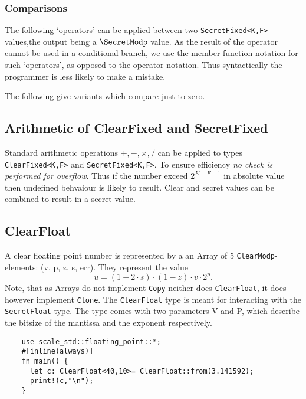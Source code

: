 \subsubsection{Comparisons}
The following `operators' can be applied between two \verb|SecretFixed<K,F>|
values,the output being a $\SecretModp$ value.
As the result of the operator cannot be used in a conditional branch,
we use the member function notation for such `operators', as opposed
to the operator notation. Thus syntactically the programmer is less
likely to make a mistake.

\noindent
The following give variants which compare just to zero.


\subsection{Arithmetic of ClearFixed and SecretFixed}
Standard arithmetic operations $+, -, \times, /$ can be applied to
types \verb|ClearFixed<K,F>| and \verb|SecretFixed<K,F>|.
To ensure efficiency {\em no check is performed for overflow}.
Thus if the number exceed $2^{K-F-1}$ in absolute value then 
undefined behvaiour is likely to result.
Clear and secret values can be combined to result in a secret
value.

\subsection{ClearFloat}
A clear floating point number is represented by a an Array of 5 \verb|ClearModp|-elements: (v, p, z, s, err). They represent the value
\[ u=(1-2\cdot s) \cdot (1-z) \cdot v \cdot 2^{p}. \]
Note, that as Arrays do not implement \verb|Copy| neither does  \verb|ClearFloat|,
it does however implement \verb|Clone|.
The \verb|ClearFloat| type is meant for interacting with the \verb|SecretFloat| type. 
The type comes with two parameters V and P, which describe the bitsize of the mantissa and the exponent respectively. 

\begin{lstlisting}
    use scale_std::floating_point::*;
    #[inline(always)]
    fn main() {
      let c: ClearFloat<40,10>= ClearFloat::from(3.141592);
      print!(c,"\n");
    }
\end{lstlisting}

